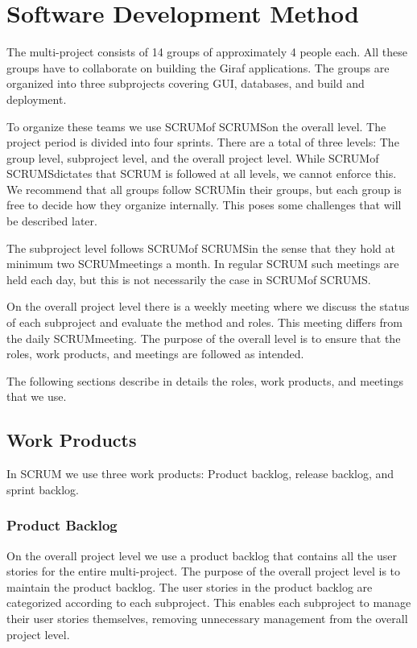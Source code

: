\chapter{Software Development Method}%
The multi-project consists of 14 groups of approximately 4 people each. All these groups have to collaborate on building the Giraf applications. The groups are organized into three subprojects covering GUI\@, databases, and build and deployment.

To organize these teams we use SCRUM\@ of SCRUMS\@ on the overall level. The project period is divided into four sprints. There are a total of three levels: The group level, subproject level, and the overall project level. While SCRUM\@ of SCRUMS\@ dictates that SCRUM is followed at all levels, we cannot enforce this. We recommend that all groups follow SCRUM\@ in their groups, but each group is free to decide how they organize internally. This poses some challenges that will be described later.

The subproject level follows SCRUM\@ of SCRUMS\@ in the sense that they hold at minimum two SCRUM\@ meetings a month. In regular SCRUM such meetings are held each day, but this is not necessarily the case in SCRUM\@ of SCRUMS\@.

On the overall project level there is a weekly meeting where we discuss the status of each subproject and evaluate the method and roles. This meeting differs from the daily SCRUM\@ meeting. The purpose of the overall level is to ensure that the roles, work products, and meetings are followed as intended.

The following sections describe in details the roles, work products, and meetings that we use.

\section{Work Products}
In SCRUM we use three work products: Product backlog, release backlog, and sprint backlog.

\subsection{Product Backlog}
On the overall project level we use a product backlog that contains all the user stories for the entire multi-project. The purpose of the overall project level is to maintain the product backlog. The user stories in the product backlog are categorized according to each subproject. This enables each subproject to manage their user stories themselves, removing unnecessary management from the overall project level.

